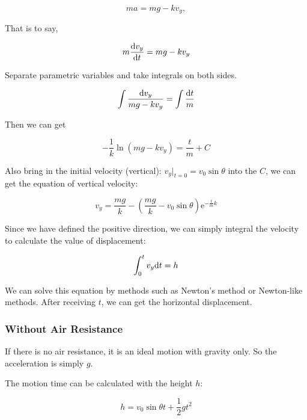 \documentclass{article}
\begin{document}
\begin{equation*}
    ma = mg - kv_y,
\end{equation*}

That is to say,

\begin{equation}
    m\dfrac{\mathrm{d} v_y}{\mathrm{d} t} = mg - kv_y
\end{equation}

Separate parametric variables and take integrals on both sides.

\begin{equation}
    \int\dfrac{\mathrm{d} v_y}{mg - kv_y} = \int\dfrac{\mathrm{d} t}{m}
\end{equation}

Then we can get

\begin{equation}
    -\dfrac{1}{k}\ln\left(mg-kv_y\right)=\dfrac{t}{m}+C
\end{equation}

Also bring in the initial velocity (vertical): $v_y\big\vert_{t=0}=v_0\sin\theta$ into the $C$, we can get the equation of vertical velocity:

\begin{equation}
    v_y=\dfrac{mg}{k}-\left(\dfrac{mg}{k}-v_0\sin\theta\right)\mathrm{e}^{-\frac{t}{m}k} \label{eq:vertical-velocity}
\end{equation}

Since we have defined the positive direction, we can simply integral the velocity to calculate the value of displacement:

\begin{equation}
    \int^t_0v_y\mathrm{d} t=h
\end{equation}

We can solve this equation by methods such as Newton's method or Newton-like methods. After receiving $t$, we can get the horizontal displacement.

\subsubsection{Without Air Resistance}

If there is no air resistance, it is an ideal motion with gravity only. So the acceleration is simply $g$.

The motion time can be calculated with the height $h$:

\begin{equation}
    h = v_0\sin\theta t + \dfrac{1}{2}gt^2
\end{equation}
\end{document}
